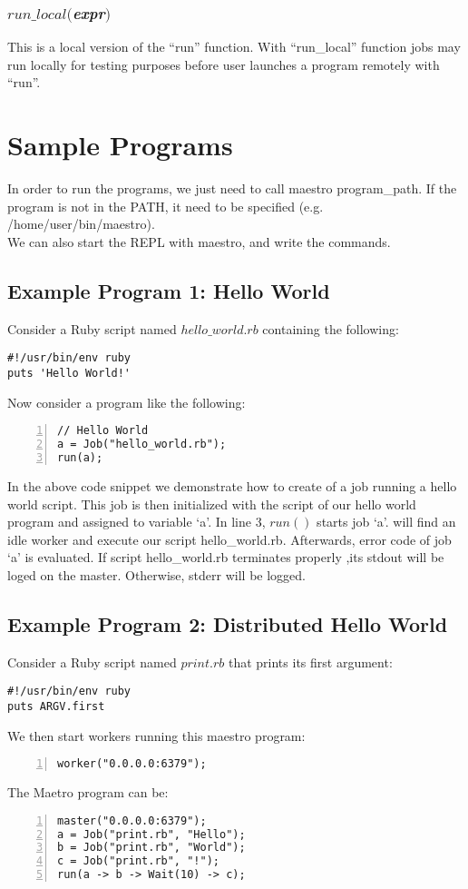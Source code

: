 \subsubsection*{$run\_local($\textit{expr}$)$}
This is a local version of the ``run'' function.
With ``run\_local'' function jobs may run locally for testing purposes before
user launches a program remotely with ``run''.


\section{Sample Programs}
\label{sect:samples}
In order to run the programs, we just need to call maestro program\_path. If the \lang{} 
program is not in the PATH, it need to be specified (e.g. /home/user/bin/maestro).\\
We can also start the REPL with maestro, and write the commands.

\subsection*{Example Program 1: Hello World}
Consider a Ruby script named $hello\_world.rb$ containing the following:
\begin{verbatim}
#!/usr/bin/env ruby
puts 'Hello World!'
\end{verbatim}
Now consider a \lang{} program like the following:
\begin{Verbatim}[numbers=left]
// Hello World
a = Job("hello_world.rb");
run(a);
\end{Verbatim}

In the above code snippet we demonstrate how to create of a job running a
hello world script.
This job is then initialized with the script of our hello world program and
assigned to variable `a'. In line 3, $run()$ starts job `a'. 
\lang{} will find an idle worker and execute our script hello\_world.rb.
Afterwards, error code of job `a' is evaluated. If script hello\_world.rb terminates properly
,its stdout will be loged on the master. Otherwise, stderr will be logged.

\subsection*{Example Program 2: Distributed Hello World}
Consider a Ruby script named $print.rb$ that prints its first argument:
\begin{verbatim}
#!/usr/bin/env ruby
puts ARGV.first
\end{verbatim}
We then start workers running this maestro program:
\begin{Verbatim}[numbers=left]
worker("0.0.0.0:6379");
\end{Verbatim}
The Maetro program can be:
\begin{Verbatim}[numbers=left]
master("0.0.0.0:6379");
a = Job("print.rb", "Hello");
b = Job("print.rb", "World");
c = Job("print.rb", "!");
run(a -> b -> Wait(10) -> c);
\end{Verbatim}

